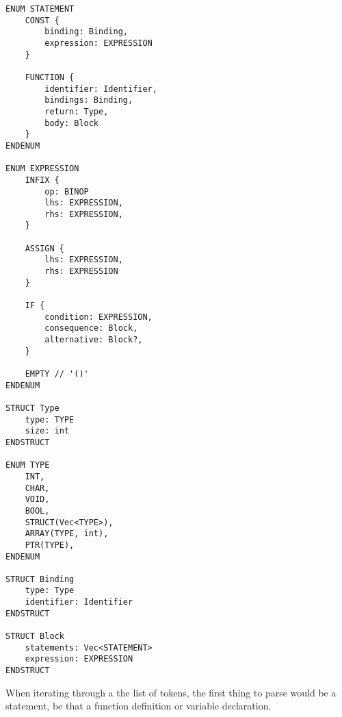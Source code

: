\begin{lstlisting}
ENUM STATEMENT
    CONST {
        binding: Binding, 
        expression: EXPRESSION
    }

    FUNCTION {
        identifier: Identifier,
        bindings: Binding,
        return: Type,
        body: Block
    }
ENDENUM

ENUM EXPRESSION 
    INFIX {
        op: BINOP 
        lhs: EXPRESSION,
        rhs: EXPRESSION,
    }

    ASSIGN {
        lhs: EXPRESSION,
        rhs: EXPRESSION
    }

    IF {
        condition: EXPRESSION,
        consequence: Block,
        alternative: Block?,
    }

    EMPTY // '()'
ENDENUM

STRUCT Type 
    type: TYPE
    size: int
ENDSTRUCT  

ENUM TYPE 
    INT,
    CHAR,
    VOID,
    BOOL,
    STRUCT(Vec<TYPE>),
    ARRAY(TYPE, int),
    PTR(TYPE),
ENDENUM

STRUCT Binding 
    type: Type 
    identifier: Identifier
ENDSTRUCT

STRUCT Block 
    statements: Vec<STATEMENT>
    expression: EXPRESSION 
ENDSTRUCT
\end{lstlisting}

When iterating through a the list of tokens, the first thing to parse would be a statement, be that a function definition or variable declaration.

